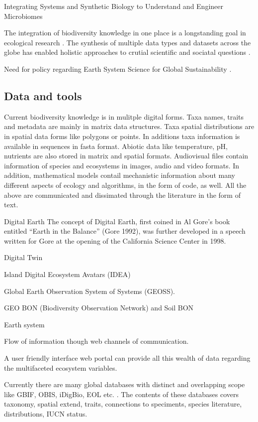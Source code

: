 Integrating Systems and Synthetic Biology to Understand and Engineer Microbiomes \parencite{Leggieri2021}

The integration of biodiversity knowledge in one place is a longstanding
goal in ecological research \parencite{Walter_2012}. The synthesis of multiple
data types and datasets across the globe has enabled 
holistic approaches to crutial scientific and sociatal questions \parencite{heberling_j_mason_data_2021}.

Need for policy regarding Earth System Science for Global
Sustainability \parencite{reid2010earth}.

\subsection{Data and tools}
\label{sec:data-tools}

Current biodiversity knowledge is in mulitple digital forms. 
Taxa names, traits and metadata are mainly in matrix data
structures. Taxa spatial distributions are in spatial data
forms like polygons or points. In additions taxa information
is available in sequences in fasta format. Abiotic data like 
temperature, pH, nutrients are also stored in matrix
and spatial formats. Audiovisual files contain information
of species and ecosystems in images, audio and video formats.
In addition, mathematical models contail mechanistic information
about many different aspects of ecology and algorithms, in the 
form of code, as well. All the above are communicated and dissimated through the
literature in the form of text.

Digital Earth
The concept of Digital Earth, first coined in Al Gore’s book entitled 
“Earth in the Balance” (Gore 1992), was further developed in a speech
written for Gore at the opening of the California Science Center in 1998.

Digital Twin

Island Digital Ecosystem Avatars (IDEA)

Global Earth Observation System of Systems (GEOSS).

GEO BON (Biodiversity Observation Network) and Soil BON

Earth system

Flow of information though web channels of communication.

A user friendly interface web portal can provide all this wealth of data
regarding the multifaceted ecosystem variables. 

Currently there are many global databases with distinct and overlapping 
scope like GBIF, OBIS, iDigBio, EOL etc. \parencite{feng2022Review}. 
The contents of these databases covers taxonomy, spatial extend, traits, 
connections to speciments, species literature, distributions,
IUCN status.

